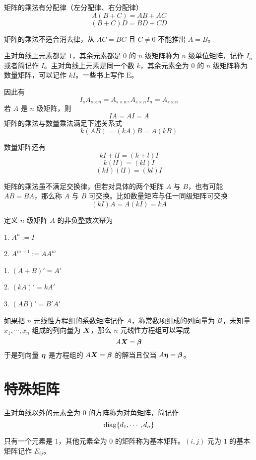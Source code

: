 \begin{theorem}
    矩阵的乘法有分配律（左分配律、右分配律）
    $$A(B+C) = AB+AC$$
    $$(B+C)D = BD + CD$$
\end{theorem}

矩阵的乘法不适合消去律，从 $AC = BC$ 且 $C\ne 0$ 不能推出 $A=B$。

主对角线上元素都是 $1$，其余元素都是 $0$ 的 $n$ 级矩阵称为 $n$ 级单位矩阵，记作 $I_n$ 或者简记作 $I$。主对角线上元素是同一个数 $k$，其余元素全为 $0$ 的 $n$ 级矩阵称为数量矩阵，可以记作 $kI$。一些书上写作 $\mathrm{E}$。

因此有
$$I_s A_{s\times n} = A_{s\times n}, A_{s\times n} I_n= A_{s\times n}$$
若 $A$ 是 $n$ 级矩阵，则
$$IA = AI = A$$
矩阵的乘法与数量乘法满足下述关系式
$$k(AB) = (kA)B = A(kB)$$

数量矩阵还有
$$kI + lI = (k+l)I$$
$$k(lI) = (kl)I$$
$$(kI)(lI) = (kl)I$$

矩阵的乘法虽不满足交换律，但若对具体的两个矩阵 $A$ 与 $B$，也有可能 $AB = BA$，那么称 $A$ 与 $B$ 可交换。比如数量矩阵与任一同级矩阵可交换
$$(kI)A = A(kI) = kA$$

\begin{definition}
    定义 $n$ 级矩阵 $A$ 的非负整数次幂为

    1. $A^n := I$

    2. $A^{m+1} := AA^m$
\end{definition}


\begin{theorem}
    1. $(A+B)' = A'$
    
    2. $(kA)' = kA'$
    
    3. $(AB)' = B'A'$
\end{theorem}

如果把 $n$ 元线性方程组的系数矩阵记作 $A$，称常数项组成的列向量为 $\boldsymbol{\beta}$，未知量 $x_1,\cdots,x_n$ 组成的列向量为 $\boldsymbol{X}$，那么 $n$ 元线性方程组可以写成
$$A\boldsymbol{X} = \boldsymbol{\beta}$$
于是列向量 $\boldsymbol{\eta}$ 是方程组的 $A\boldsymbol{X} = \boldsymbol{\beta}$ 的解当且仅当 $A\boldsymbol{\eta} = \boldsymbol{\beta}$。

\section{特殊矩阵}

\begin{definition}
    主对角线以外的元素全为 $0$ 的方阵称为对角矩阵，简记作
    $$\operatorname{diag}\{d_1,\cdots,d_n\}$$
\end{definition}

\begin{definition}
    只有一个元素是 $1$，其他元素全为 $0$ 的矩阵称为基本矩阵。$(i,j)$ 元为 $1$ 的基本矩阵记作 $E_{ij}$。
\end{definition}

